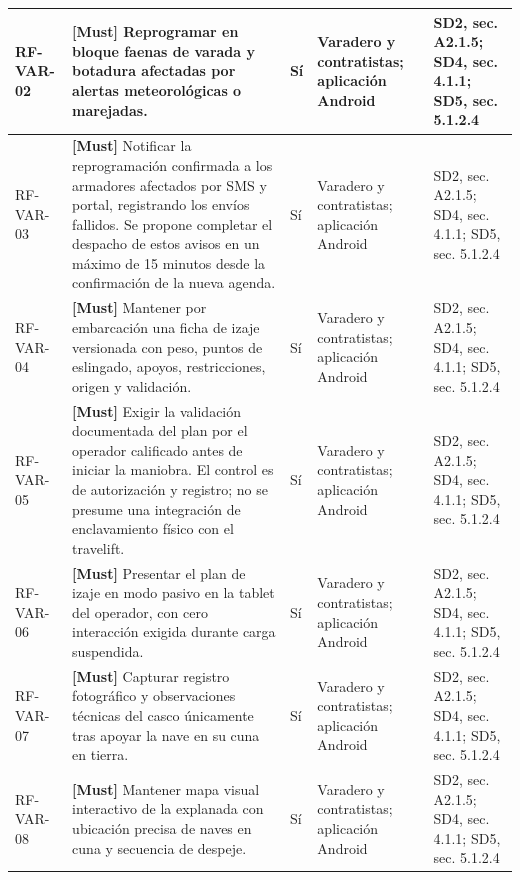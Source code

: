 \begin{paginaHorizontalSynaptix}
\begin{longtable}{|L{0.09\AnchoMatrizTDoce}|L{0.385\AnchoMatrizTDoce}|L{0.065\AnchoMatrizTDoce}|L{0.18\AnchoMatrizTDoce}|L{0.28\AnchoMatrizTDoce}|}
RF-\allowbreak{}VAR-\allowbreak{}02 &
\textbf{[Must]} Reprogramar en bloque faenas de varada y botadura afectadas por alertas meteorológicas o marejadas. &
Sí &
Varadero y contratistas; aplicación Android &
SD2, sec. A2.1.5; SD4, sec. 4.1.1; SD5, sec. 5.1.2.4 \\ \hline

RF-\allowbreak{}VAR-\allowbreak{}03 &
\textbf{[Must]} Notificar la reprogramación confirmada a los armadores afectados por SMS y portal, registrando los envíos fallidos. Se propone completar el despacho de estos avisos en un máximo de 15 minutos desde la confirmación de la nueva agenda. &
Sí &
Varadero y contratistas; aplicación Android &
SD2, sec. A2.1.5; SD4, sec. 4.1.1; SD5, sec. 5.1.2.4 \\ \hline

RF-\allowbreak{}VAR-\allowbreak{}04 &
\textbf{[Must]} Mantener por embarcación una ficha de izaje versionada con peso, puntos de eslingado, apoyos, restricciones, origen y validación. &
Sí &
Varadero y contratistas; aplicación Android &
SD2, sec. A2.1.5; SD4, sec. 4.1.1; SD5, sec. 5.1.2.4 \\ \hline

RF-\allowbreak{}VAR-\allowbreak{}05 &
\textbf{[Must]} Exigir la validación documentada del plan por el operador calificado antes de iniciar la maniobra. El control es de autorización y registro; no se presume una integración de enclavamiento físico con el travelift. &
Sí &
Varadero y contratistas; aplicación Android &
SD2, sec. A2.1.5; SD4, sec. 4.1.1; SD5, sec. 5.1.2.4 \\ \hline

RF-\allowbreak{}VAR-\allowbreak{}06 &
\textbf{[Must]} Presentar el plan de izaje en modo pasivo en la tablet del operador, con cero interacción exigida durante carga suspendida. &
Sí &
Varadero y contratistas; aplicación Android &
SD2, sec. A2.1.5; SD4, sec. 4.1.1; SD5, sec. 5.1.2.4 \\ \hline

RF-\allowbreak{}VAR-\allowbreak{}07 &
\textbf{[Must]} Capturar registro fotográfico y observaciones técnicas del casco únicamente tras apoyar la nave en su cuna en tierra. &
Sí &
Varadero y contratistas; aplicación Android &
SD2, sec. A2.1.5; SD4, sec. 4.1.1; SD5, sec. 5.1.2.4 \\ \hline

RF-\allowbreak{}VAR-\allowbreak{}08 &
\textbf{[Must]} Mantener mapa visual interactivo de la explanada con ubicación precisa de naves en cuna y secuencia de despeje. &
Sí &
Varadero y contratistas; aplicación Android &
SD2, sec. A2.1.5; SD4, sec. 4.1.1; SD5, sec. 5.1.2.4 \\ \hline
\end{longtable}



\end{paginaHorizontalSynaptix}
